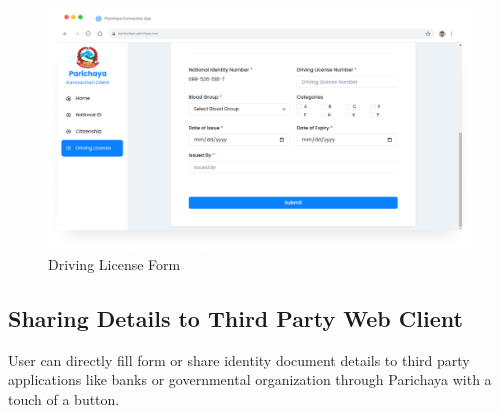         \begin{figure}[H]
        \centering
        \includegraphics[width=0.8\linewidth]{images/results/web/WebDrivingLicenseRegistration3.png}
        \caption[Driving License Form]{Driving License Form}
        \label{fig:WebDrivingLicenseRegistration3.png}
        \end{figure}
        
    \subsection{Sharing Details to Third Party Web Client}
        User can directly fill form or share identity document details to third party applications like banks or governmental organization through Parichaya with a touch of a button.     
   

